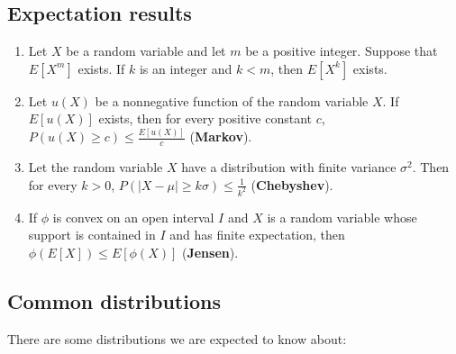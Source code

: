 \documentclass[twoside]{article}
\begin{document}
\subsection{Expectation results}
\begin{enumerate}
\item Let $X$ be a random variable and let $m$ be a positive integer. 
Suppose that $E[X^m]$ exists. If $k$ is an integer and $k < m$, then
$E[X^k]$ exists.
\item Let $u(X)$ be a nonnegative function of the random variable $X$. If
$E[u(X)]$ exists, then for every positive constant $c$,
$P(u(X)\geq c) \leq \frac{E[u(X)]}{c}$ (\textbf{Markov}).
\item Let the random variable $X$ have a distribution with
finite variance $\sigma^2$. Then for every $k>0$, 
$P(|X-\mu|\geq k\sigma) \leq \frac{1}{k^2}$ (\textbf{Chebyshev}).
\item If $\phi$ is convex on an open interval $I$ and $X$ is a random
variable whose support is contained in $I$ and has finite expectation,
then $ \phi(E[X]) \leq E[\phi(X)]$ (\textbf{Jensen}).
\end{enumerate}

\subsection{Common distributions}
There are some distributions we are expected to know about:
\end{document}
